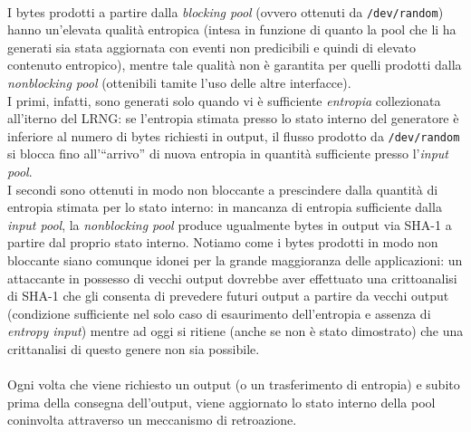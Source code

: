 \documentclass{article}
\begin{document}
 \paragraph{}I bytes prodotti a partire dalla
 \emph{blocking pool} (ovvero ottenuti da \verb+/dev/random+) hanno un'elevata
 qualità entropica (intesa in funzione di quanto la pool che li ha generati sia
 stata aggiornata con eventi non predicibili e quindi di elevato contenuto
 entropico), mentre tale qualità non è garantita per quelli prodotti dalla
 \emph{nonblocking pool} (ottenibili tamite l'uso delle altre interfacce).\\
 I primi, infatti, sono generati solo quando vi è sufficiente \emph{entropia}
 collezionata all'iterno del LRNG: se l'entropia stimata presso lo stato interno
 del generatore è inferiore al numero di bytes richiesti in output,
 il flusso prodotto da \verb+/dev/random+ si blocca fino all'``arrivo'' di nuova
 entropia in quantità sufficiente presso l'\emph{input pool}.\\ I secondi sono
 ottenuti in modo non bloccante a prescindere dalla quantità di entropia
 stimata per lo stato interno: in mancanza di entropia sufficiente dalla
 \emph{input pool}, la \emph{nonblocking pool} produce ugualmente bytes in
 output via SHA-1 a partire dal proprio stato interno. Notiamo come i bytes
 prodotti in modo non bloccante siano comunque idonei per la grande maggioranza
 delle applicazioni: un attaccante in possesso di vecchi output dovrebbe
 aver effettuato una crittoanalisi di SHA-1 che gli consenta di prevedere futuri
 output a partire da vecchi output (condizione sufficiente nel solo caso di
 esaurimento dell'entropia e assenza di \emph{entropy input}) mentre ad oggi si
 ritiene (anche se non è stato dimostrato) che una crittanalisi di questo genere
 non sia possibile.
 
 \paragraph{} Ogni volta che viene richiesto un output (o un trasferimento di
 entropia) e subito prima della consegna dell'output, viene aggiornato lo stato
 interno della pool coninvolta attraverso un meccanismo di retroazione.
 
\end{document}
